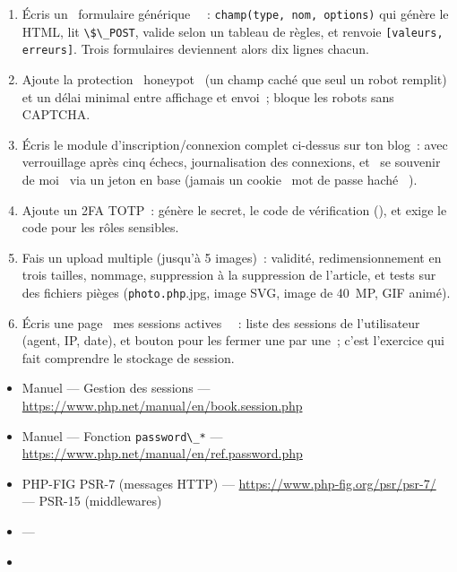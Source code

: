 \begin{exercice}
\begin{enumerate}
  \item \'Ecris un \og ~formulaire g\'en\'erique~ \fg{}~: \verb|champ(type, nom, options)| qui g\'en\`ere le HTML,
        lit \verb|\$\_POST|, valide selon un tableau de r\`egles, et renvoie
        \verb|[valeurs, erreurs]|. Trois formulaires deviennent alors dix lignes chacun.
  \item Ajoute la protection \og ~honeypot~ \fg{} (un champ cach\'e que seul un robot remplit) et un
        d\'elai minimal entre affichage et envoi~; bloque les robots sans CAPTCHA.
  \item \'Ecris le module d'inscription/connexion complet ci-dessus sur ton blog~: avec verrouillage
        apr\`es cinq \'echecs, journalisation des connexions, et \og ~se souvenir de moi~ \fg{} via un jeton
        en base (jamais un cookie \og ~mot de passe hach\'e~ \fg{}).
  \item Ajoute un 2FA TOTP~: g\'en\`ere le secret, le code de v\'erification (),
        et exige le code pour les r\^oles sensibles.
  \item Fais un upload multiple (jusqu'\`a 5 images)~: validit\'e, redimensionnement en trois
        tailles, nommage, suppression \`a la suppression de l'article, et tests sur des fichiers
        pi\`eges (\verb|photo.php|.jpg, image SVG, image de 40~MP, GIF anim\'e).
  \item \'Ecris une page \og ~mes sessions actives~ \fg{}~: liste des sessions de l'utilisateur (agent,
        IP, date), et bouton pour les fermer une par une~; c'est l'exercice qui fait comprendre
        le stockage de session.
\end{enumerate}
\end{exercice}

\begin{ressources}
\begin{itemize}
  \item Manuel --- Gestion des sessions --- \url{https://www.php.net/manual/en/book.session.php}
  \item Manuel --- Fonction \verb|password\_*| --- \url{https://www.php.net/manual/en/ref.password.php}
  \item PHP-FIG PSR-7 (messages HTTP) --- \url{https://www.php-fig.org/psr/psr-7/} --- PSR-15 (middlewares)
  \item {} --- 
  \item {}
\end{itemize}
\end{ressources}

